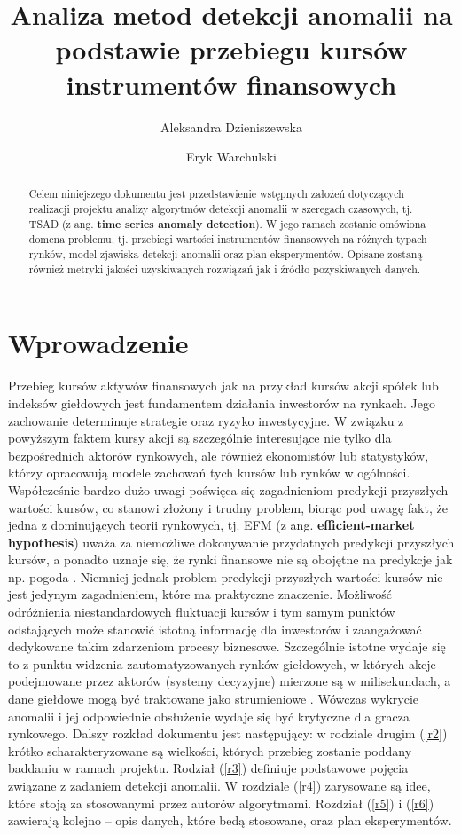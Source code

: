 \documentclass{article}
\title{Analiza metod detekcji anomalii na podstawie przebiegu kursów
instrumentów finansowych}
\author{Aleksandra Dzieniszewska \and Eryk Warchulski}
\date{}
\begin{document}
\maketitle
\begin{abstract}
  Celem niniejszego dokumentu jest przedstawienie wstępnych założeń
  dotyczących realizacji projektu analizy algorytmów detekcji anomalii w
  szeregach czasowych, tj. TSAD (z ang. \textbf{time series anomaly
  detection}). W jego ramach zostanie omówiona domena problemu, tj.
  przebiegi wartości instrumentów finansowych na różnych typach rynków,
  model zjawiska detekcji anomalii oraz plan eksperymentów. Opisane
  zostaną również metryki jakości uzyskiwanych rozwiązań jak i źródło
  pozyskiwanych danych.
\end{abstract}

\section{Wprowadzenie}


  Przebieg kursów aktywów finansowych jak na przykład kursów akcji
  spółek lub indeksów giełdowych jest fundamentem działania inwestorów na
  rynkach. Jego zachowanie determinuje strategie oraz ryzyko inwestycyjne.
  W związku z powyższym faktem kursy akcji są szczególnie interesujące nie
  tylko dla bezpośrednich aktorów rynkowych, ale również ekonomistów lub
  statystyków, którzy opracowują modele zachowań tych kursów lub rynków w
  ogólności. Współcześnie bardzo dużo uwagi poświęca się zagadnieniom
  predykcji przyszłych wartości kursów, co stanowi złożony i trudny
  problem, biorąc pod uwagę fakt, że jedna z dominujących teorii
  rynkowych, tj. EFM (z ang. \textbf{efficient-market hypothesis}) uważa
  za niemożliwe dokonywanie przydatnych predykcji \cite{RandomWalk}
  przyszłych kursów, a ponadto uznaje się, że rynki finansowe nie są
  obojętne na predykcje jak np. pogoda \cite{Sapiens}. Niemniej jednak
  problem predykcji przyszłych wartości kursów nie jest jedynym
  zagadnieniem, które ma praktyczne znaczenie. Możliwość odróżnienia
  niestandardowych fluktuacji kursów i tym samym punktów odstających może
  stanowić istotną informację dla inwestorów i zaangażować dedykowane
  takim zdarzeniom procesy biznesowe. Szczególnie istotne wydaje się to z
  punktu widzenia zautomatyzowanych rynków giełdowych, w których akcje
  podejmowane przez aktorów (systemy decyzyjne) mierzone są w
  milisekundach, a dane giełdowe mogą być traktowane jako strumieniowe
  \cite{HFT-wiki}. Wówczas wykrycie anomalii i jej odpowiednie obsłużenie
  wydaje się być krytyczne dla gracza rynkowego.
  \newline
  Dalszy rozkład dokumentu jest następujący: w rodziale drugim (\ref{r2}) krótko
  scharakteryzowane są wielkości, których przebieg zostanie poddany baddaniu w ramach projektu. Rodział (\ref{r3}) definiuje podstawowe pojęcia związane z zadaniem detekcji anomalii. W rozdziale (\ref{r4}) zarysowane są idee, które stoją za stosowanymi przez autorów algorytmami. Rozdział (\ref{r5}) i (\ref{r6}) zawierają kolejno -- opis danych, które bedą stosowane, oraz plan eksperymentów. 
\end{document}

